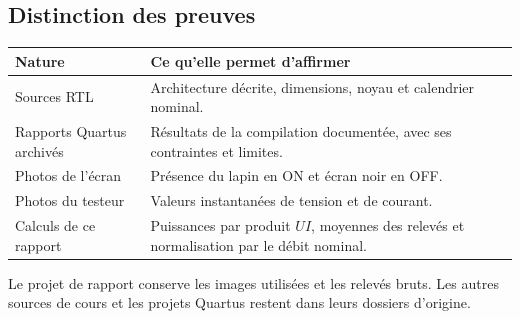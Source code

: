 \documentclass[11pt,a4paper]{article}
\begin{document}
\subsection*{Distinction des preuves}
\begin{center}
\begin{tabularx}{\linewidth}{@{}l X@{}}
\toprule
Nature & Ce qu'elle permet d'affirmer\\
\midrule
Sources RTL & Architecture décrite, dimensions, noyau et calendrier nominal.\\
Rapports Quartus archivés & Résultats de la compilation documentée, avec ses contraintes et limites.\\
Photos de l'écran & Présence du lapin en ON et écran noir en OFF.\\
Photos du testeur & Valeurs instantanées de tension et de courant.\\
Calculs de ce rapport & Puissances par produit $UI$, moyennes des relevés et normalisation par le débit nominal.\\
\bottomrule
\end{tabularx}
\end{center}

Le projet de rapport conserve les images utilisées et les relevés bruts. Les autres sources de cours et les projets Quartus restent dans leurs dossiers d'origine.
\end{document}
